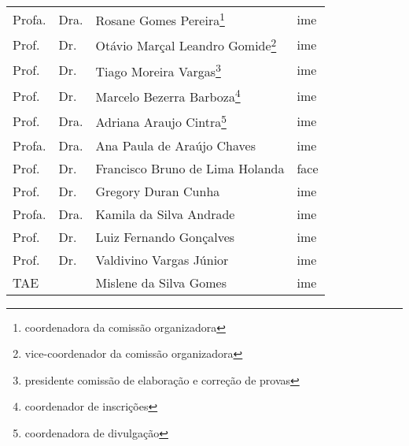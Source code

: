 \documentclass[a4paper,12pt]{article}
\begin{document}
\begin{table}[H]
  \centering
  \begin{tabular}{llll}
    Profa. & Dra. & Rosane Gomes Pereira\footnote{coordenadora da comissão organizadora}                  & \acrshort{ime}  \\
    Prof.  & Dr.  & Otávio Marçal Leandro Gomide\footnote{vice-coordenador da comissão organizadora}      & \acrshort{ime}  \\
    Prof.  & Dr.  & Tiago Moreira Vargas\footnote{presidente comissão de elaboração e correção de provas} & \acrshort{ime}  \\
    Prof.  & Dr.  & Marcelo Bezerra Barboza\footnote{coordenador de inscrições}                           & \acrshort{ime}  \\
    Prof.  & Dra. & Adriana Araujo Cintra\footnote{coordenadora de divulgação}                            & \acrshort{ime}  \\
    Profa. & Dra. & Ana Paula de Araújo Chaves                                                            & \acrshort{ime}  \\
    Prof.  & Dr.  & Francisco Bruno de Lima Holanda                                                       & \acrshort{face} \\
    Prof.  & Dr.  & Gregory Duran Cunha                                                                   & \acrshort{ime}  \\
    Profa. & Dra. & Kamila da Silva Andrade                                                               & \acrshort{ime}  \\
    Prof.  & Dr.  & Luiz Fernando Gonçalves                                                               & \acrshort{ime}  \\
    Prof.  & Dr.  & Valdivino Vargas Júnior                                                               & \acrshort{ime}  \\
    TAE    &      & Mislene da Silva Gomes                                                                & \acrshort{ime}
  \end{tabular}
\end{table}
\end{document}
